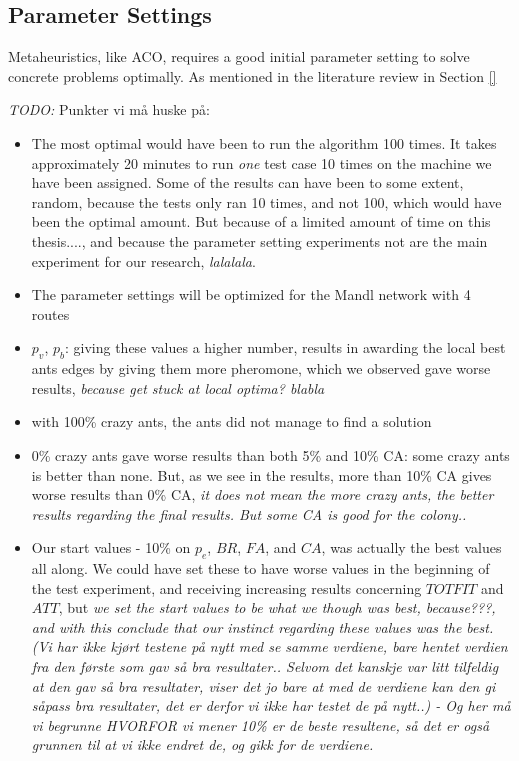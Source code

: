
\subsection{Parameter Settings}

Metaheuristics, like ACO, requires a good initial parameter setting to solve concrete problems optimally. As mentioned in the literature review in Section \vref{}

\emph{\color{blue} TODO:}
Punkter vi må huske på:
\begin{itemize}
\item The most optimal would have been to run the algorithm 100 times. It takes approximately 20 minutes to run \textit{one} test case 10 times on the machine we have been assigned. %
Some of the results can have been to some extent, random, because the tests only ran 10 times, and not 100, which would have been the optimal amount. But because of a limited amount of time on this thesis...., and because the parameter setting experiments not are the main experiment for our research, \emph{\color{blue} lalalala}. 
\item The parameter settings will be optimized for the Mandl network with 4 routes
\item $p_v$, $p_b$: giving these values a higher number, results in awarding the local best ants edges by giving them more pheromone, which we observed gave worse results, \emph{\color{blue}because get stuck at local optima? blabla}
\item with 100\% crazy ants, the ants did not manage to find a solution 
\item 0\% crazy ants gave worse results than both 5\% and 10\% CA: some crazy ants is better than none. But, as we see in the results, more than 10\% CA gives worse results than 0\% CA, \emph{\color{blue} it does not mean the more crazy ants, the better results regarding the final results. But some CA is good for the colony..}
\item Our start values - 10\% on $p_e$, $BR$, $FA$, and $CA$, was actually the best values all along. We could have set these to have worse values in the beginning of the test experiment, and receiving increasing results concerning $TOTFIT$ and $ATT$, but \emph{\color{blue} we set the start values to be what we though was best, because???, and with this conclude that our instinct regarding these values was the best. (Vi har ikke kjørt testene på nytt med se samme verdiene, bare hentet verdien fra den første som gav så bra resultater.. Selvom det kanskje var litt tilfeldig at den gav så bra resultater, viser det jo bare at med de verdiene kan den gi såpass bra resultater, det er derfor vi ikke har testet de på nytt..) - Og her må vi begrunne HVORFOR vi mener 10\% er de beste resultene, så det er også grunnen til at vi ikke endret de, og gikk for de verdiene.}

\end{itemize}
